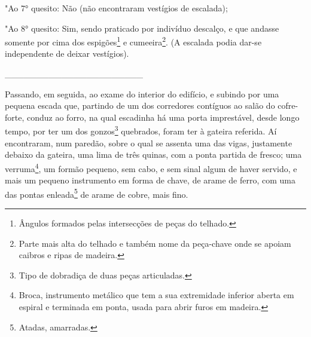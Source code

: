 "Ao 7° quesito: Não (não encontraram vestígios de escalada);

"Ao 8° quesito: Sim, sendo praticado por indivíduo descalço, e que
andasse somente por cima dos espigões\footnote{Ângulos formados pelas
  intersecções de peças do telhado.} e cumeeira\footnote{Parte mais alta
  do telhado e também nome da peça-chave onde se apoiam caibros e ripas
  de madeira.}. (A escalada podia dar-se independente de deixar
vestígios).

\_\_\_\_\_\_\_\_\_\_\_\_\_\_\_\_\_\_\_\_\_\_

Passando, em seguida, ao exame do interior do edifício, e subindo por
uma pequena escada que, partindo de um dos corredores contíguos ao salão
do cofre-forte, conduz ao forro, na qual escadinha há uma porta
imprestável, desde longo tempo, por ter um dos gonzos\footnote{Tipo de
  dobradiça de duas peças articuladas.} quebrados, foram ter à gateira
referida. Aí encontraram, num paredão, sobre o qual se assenta uma das
vigas, justamente debaixo da gateira, uma lima de três quinas, com a
ponta partida de fresco; uma verruma\footnote{Broca, instrumento
  metálico que tem a sua extremidade inferior aberta em espiral e
  terminada em ponta, usada para abrir furos em madeira.}, um formão
pequeno, sem cabo, e sem sinal algum de haver servido, e mais um pequeno
instrumento em forma de chave, de arame de ferro, com uma das pontas
enleada\footnote{Atadas, amarradas.} de arame de cobre, mais fino.

